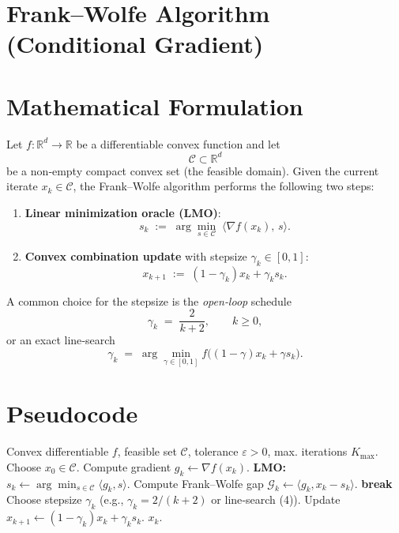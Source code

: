 \documentclass{article}
\newcommand{\gap}{\mathcal{G}}
\begin{document}
\section*{Frank–Wolfe Algorithm (Conditional Gradient)}

\section*{Mathematical Formulation}
Let $f:\mathbb{R}^d\rightarrow\mathbb{R}$ be a differentiable convex function and let 
\[
\mathcal{C}\subset\mathbb{R}^d
\]
be a non‑empty compact convex set (the feasible domain).  
Given the current iterate $x_k\in\mathcal{C}$, the Frank–Wolfe algorithm performs the following two steps:

\begin{enumerate}[label=\arabic*)]
\item \textbf{Linear minimization oracle (LMO)}:
\[
s_k \;:=\; \arg\min_{s\in\mathcal{C}} \;\langle \nabla f(x_k),\,s\rangle .
\tag{1}
\]
\item \textbf{Convex combination update} with stepsize $\gamma_k\in[0,1]$:
\[
x_{k+1}\;:=\;(1-\gamma_k)x_k+\gamma_k s_k .
\tag{2}
\]
\end{enumerate}
A common choice for the stepsize is the \emph{open‑loop} schedule
\[
\gamma_k \;=\; \frac{2}{k+2},\qquad k\ge 0,
\tag{3}
\]
or an exact line‑search
\[
\gamma_k\;=\;\arg\min_{\gamma\in[0,1]} f\bigl((1-\gamma)x_k+\gamma s_k\bigr).
\tag{4}
\]

\section*{Pseudocode}
\begin{algorithm}[H]
\caption{Frank–Wolfe (Conditional Gradient)}\label{alg:FW}
\begin{algorithmic}[1]
\Require Convex differentiable $f$, feasible set $\mathcal{C}$, tolerance $\varepsilon>0$, 
max. iterations $K_{\max}$.
\State Choose $x_0\in\mathcal{C}$.
    \State Compute gradient $g_k \gets \nabla f(x_k)$.
    \State \textbf{LMO:} $s_k \gets \arg\min_{s\in\mathcal{C}}\langle g_k,s\rangle$.
    \State Compute Frank–Wolfe gap $ \gap_k \gets \langle g_k, x_k-s_k\rangle$.
    \If{$\gap_k \le \varepsilon$}
        \State \textbf{break}
    \EndIf
    \State Choose stepsize $\gamma_k$ (e.g., $\gamma_k=2/(k+2)$ or line‑search (4)).
    \State Update $x_{k+1}\gets (1-\gamma_k)x_k+\gamma_k s_k$.
\EndFor
\State \Return $x_{k}$.
\end{algorithmic}
\end{algorithm}
\end{document}
